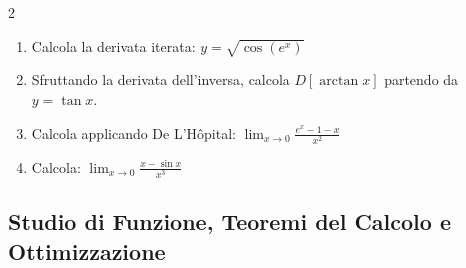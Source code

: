 \begin{multicols}{2}
\begin{enumerate}
    \item {} Calcola la derivata iterata: $y = \sqrt{\cos(e^x)}$
    \item {} Sfruttando la derivata dell'inversa, calcola $D[\arctan x]$ partendo da $y = \tan x$.
    \item {} Calcola applicando De L'Hôpital: $\lim_{x \to 0} \frac{e^x - 1 - x}{x^2}$
    \item {} Calcola: $\lim_{x \to 0} \frac{x - \sin x}{x^3}$
\end{enumerate}
\end{multicols}

\subsection{Studio di Funzione, Teoremi del Calcolo e Ottimizzazione}
